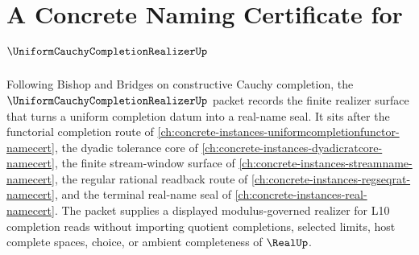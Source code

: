 \chapter{A Concrete Naming Certificate for $\UniformCauchyCompletionRealizerUp$}
\label{ch:concrete-instances-uniform-cauchy-completion-realizer-namecert}

Following Bishop and Bridges on constructive Cauchy completion, the $\UniformCauchyCompletionRealizerUp$ packet records the finite realizer surface that turns a uniform completion datum into a real-name seal. It sits after the functorial completion route of \autoref{ch:concrete-instances-uniformcompletionfunctor-namecert}, the dyadic tolerance core of \autoref{ch:concrete-instances-dyadicratcore-namecert}, the finite stream-window surface of \autoref{ch:concrete-instances-streamname-namecert}, the regular rational readback route of \autoref{ch:concrete-instances-regseqrat-namecert}, and the terminal real-name seal of \autoref{ch:concrete-instances-real-namecert}. The packet supplies a displayed modulus-governed realizer for L10 completion reads without importing quotient completions, selected limits, host complete spaces, choice, or ambient completeness of $\RealUp$.

